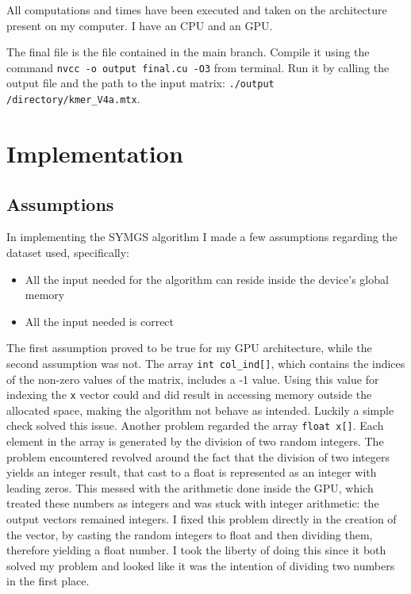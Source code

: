 \documentclass[a4paper,oneside]{report}
\begin{document}
    All computations and times have been executed and taken on the architecture present on my computer. I have an  CPU and an  GPU.

    The final file is the file  contained in the main branch. Compile it using the command \verb|nvcc -o output final.cu -O3| from terminal. Run it by calling the output file and the path to the input matrix: \verb|./output /directory/kmer_V4a.mtx|.
        
    \begingroup
    \let\clearpage\relax
    \chapter*{Implementation}
    \endgroup

    \section*{Assumptions}

    In implementing the SYMGS algorithm I made a few assumptions regarding the dataset used, specifically: 
    \begin{itemize}
        \item All the input needed for the algorithm can reside inside the device's global memory
        \item All the input needed is correct
    \end{itemize}
    The first assumption proved to be true for my GPU architecture, while the second assumption was not. The array \verb|int col_ind[]|, which contains the indices of the non-zero values of the matrix, includes a -1 value. Using this value for indexing the \verb|x| vector could and did result in accessing memory outside the allocated space, making the algorithm not behave as intended. Luckily a simple check solved this issue. Another problem regarded the array \verb|float x[]|. Each element in the array is generated by the division of two random integers. The problem encountered revolved around the fact that the division of two integers yields an integer result, that cast to a float is represented as an integer with leading zeros. This messed with the arithmetic done inside the GPU, which treated these numbers as integers and was stuck with integer arithmetic: the output vectors remained integers. I fixed this problem directly in the creation of the vector, by casting the random integers to float and then dividing them, therefore yielding a float number. I took the liberty of doing this since it both solved my problem and looked like it was the intention of dividing two numbers in the first place. 
    
\end{document}
